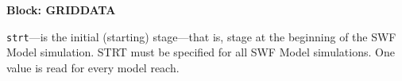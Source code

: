
\item \textbf{Block: GRIDDATA}

\begin{description}
\item \texttt{strt}---is the initial (starting) stage---that is, stage at the beginning of the SWF Model simulation.  STRT must be specified for all SWF Model simulations. One value is read for every model reach.

\end{description}

